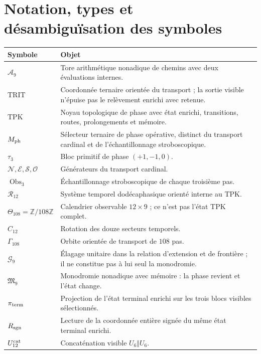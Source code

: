 \chapter*{Notation, types et désambiguïsation des symboles}

\begin{longtable}{@{}p{}p{}@{}}
\toprule
Symbole & Objet \\ \midrule
\endhead
\(\mathcal A_9\)&Tore arithmétique nonadique de chemins avec deux évaluations
internes.\\
\(\mathrm{TRIT}\)&Coordonnée ternaire orientée du transport ; la sortie
visible n'épuise pas le relèvement enrichi avec retenue.\\
\(\mathrm{TPK}\)&Noyau topologique de phase avec état enrichi,
transitions, routes, prolongements et mémoire.\\
\(M_{\rm ph}\)&Sélecteur ternaire de phase opérative, distinct du transport
cardinal et de l'échantillonnage stroboscopique.\\
\(\tau_3\)&Bloc primitif de phase \((+1,-1,0)\).\\
\(\mathcal N,\mathcal E,\mathcal S,\mathcal O\)&Générateurs du transport
cardinal.\\
\(\operatorname{Obs}_3\)&Échantillonnage stroboscopique de chaque troisième pas.\\
\(\mathcal R_{12}\)&Système temporel dodécaphasique orienté interne au TPK.\\
\(\Theta_{108}=\mathbb Z/108\mathbb Z\)&Calendrier observable
\(12\times9\) ; ce n'est pas l'état TPK complet.\\
\(C_{12}\)&Rotation des douze secteurs temporels.\\
\(\Gamma_{108}\)&Orbite orientée de transport de \(108\) pas.\\
\(\mathcal G_9\)&Élagage unitaire dans la relation d'extension et de
frontière ; il ne constitue pas à lui seul la monodromie.\\
\(\mathfrak M_9\)&Monodromie nonadique avec mémoire : la phase revient et
l'état change.\\
\(\pi_{\rm term}\)&Projection de l'état terminal enrichi sur les trois
blocs visibles sélectionnés.\\
\(R_{\rm sgn}\)&Lecture de la coordonnée entière signée du même état
terminal enrichi.\\
\(U_{12}^{\rm cat}\)&Concaténation visible \(U_6\Vert U_6\).\\

\end{longtable}
